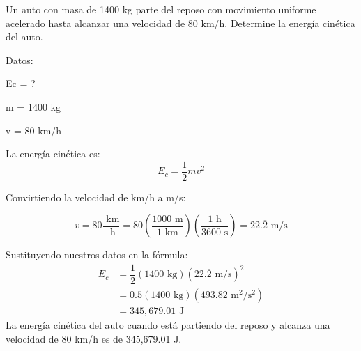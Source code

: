 \question[10] Un auto con masa de 1400 kg parte del reposo con movimiento uniforme acelerado hasta alcanzar una velocidad de 80 km/h. Determine la energía cinética del auto.

\begin{solutionbox}{8cm}
    \begin{multicols}{2}
        Datos:

        Ec = ?

        m = 1400 kg

        v = 80 km/h

        La energía cinética es:
        \[E_c=\frac{1}{2}mv^2\]


        Convirtiendo la velocidad de km/h a m/s:

        \[v=80\dfrac{\text{ km}}{\text{ h}}=80\left(\dfrac{1000 \text{ m}}{1 \text{ km}}\right)\left(\dfrac{1 \text{ h}}{3600 \text{ s}}\right)=22.\overline{2} \text{ m/s}\]

        \vspace{2cm}

        Sustituyendo nuestros datos en la fórmula:
        \[
            \begin{array}{rl}
                E_c & = \dfrac{1}{2} (1400 \text{ kg})(22.\overline{2} \text{ m/s})^2 \\[1em]
                    & = 0.5 (1400 \text{ kg})(493.82 \text{ m$^2$/s$^2$})             \\[1em]
                    & =345,679.01 \text{ J }
            \end{array}
        \]
        La energía cinética del auto cuando está partiendo del reposo y alcanza una velocidad de 80 km/h es de 345,679.01 J.
    \end{multicols}
\end{solutionbox}
